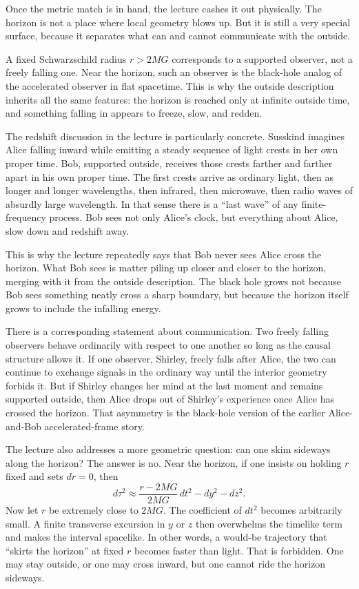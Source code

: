 Once the metric match is in hand, the lecture cashes it out physically. The horizon is not a place where local geometry blows up. But it is still a very special surface, because it separates what can and cannot communicate with the outside.

A fixed Schwarzschild radius \(r>2MG\) corresponds to a supported observer, not a freely falling one. Near the horizon, such an observer is the black-hole analog of the accelerated observer in flat spacetime. This is why the outside description inherits all the same features: the horizon is reached only at infinite outside time, and something falling in appears to freeze, slow, and redden.

The redshift discussion in the lecture is particularly concrete. Susskind imagines Alice falling inward while emitting a steady sequence of light crests in her own proper time. Bob, supported outside, receives those crests farther and farther apart in his own proper time. The first crests arrive as ordinary light, then as longer and longer wavelengths, then infrared, then microwave, then radio waves of absurdly large wavelength. In that sense there is a ``last wave'' of any finite-frequency process. Bob sees not only Alice’s clock, but everything about Alice, slow down and redshift away.

This is why the lecture repeatedly says that Bob never sees Alice cross the horizon. What Bob sees is matter piling up closer and closer to the horizon, merging with it from the outside description. The black hole grows not because Bob sees something neatly cross a sharp boundary, but because the horizon itself grows to include the infalling energy.

There is a corresponding statement about communication. Two freely falling observers behave ordinarily with respect to one another so long as the causal structure allows it. If one observer, Shirley, freely falls after Alice, the two can continue to exchange signals in the ordinary way until the interior geometry forbids it. But if Shirley changes her mind at the last moment and remains supported outside, then Alice drops out of Shirley’s experience once Alice has crossed the horizon. That asymmetry is the black-hole version of the earlier Alice-and-Bob accelerated-frame story.

The lecture also addresses a more geometric question: can one skim sideways along the horizon? The answer is no. Near the horizon, if one insists on holding \(r\) fixed and sets \(dr=0\), then
\begin{equation}
d\tau^2
\approx
\frac{r-2MG}{2MG}\,dt^2-dy^2-dz^2.
\end{equation}
Now let \(r\) be extremely close to \(2MG\). The coefficient of \(dt^2\) becomes arbitrarily small. A finite transverse excursion in \(y\) or \(z\) then overwhelms the timelike term and makes the interval spacelike. In other words, a would-be trajectory that ``skirts the horizon'' at fixed \(r\) becomes faster than light. That is forbidden. One may stay outside, or one may cross inward, but one cannot ride the horizon sideways.

